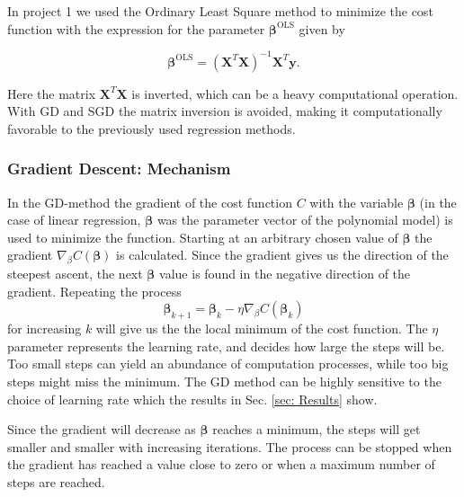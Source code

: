 \documentclass{emulateapj}
\begin{document}
In project 1 we used the Ordinary Least Square method to minimize the cost function with the expression for the parameter $\boldsymbol{\beta}^{\mathrm{OLS}}$ given by 

\begin{equation}
    \boldsymbol{\beta}^{\mathrm{OLS}} = (\mathbf{X}^T \mathbf{X})^{-1} \mathbf{X}^T \mathbf{y}.
    \label{eq:beta-ols}
\end{equation}

Here the matrix $\mathbf{X}^T\mathbf{X}$ is inverted, which can be a heavy computational operation. With GD and SGD the matrix inversion is avoided, making it computationally favorable to the previously used regression methods. 

\subsubsection{Gradient Descent: Mechanism}
\label{subsubsec: GD}
In the GD-method the gradient of the cost function $C$ with the variable $\mathbf{\beta}$ (in the case of linear regression, $\mathbf{\beta}$ was the parameter vector of the polynomial model) is used to minimize the function. Starting at an arbitrary chosen value of $\mathbf{\beta}$ the gradient $\nabla_\beta C(\mathbf{\beta})$ is calculated. Since the gradient gives us the direction of the steepest ascent, the next $\mathbf{\beta}$ value is found in the negative direction of the gradient. Repeating the process 
\begin{equation}
    \mathbf{\beta}_{k+1} = \mathbf{\beta}_k - \eta\nabla_\beta C(\mathbf{\beta}_k)
\end{equation}
for increasing $k$ will give us the the local minimum of the cost function. The $\eta$ parameter represents the learning rate, and decides how large the steps will be. Too small steps can yield an abundance of computation processes, while too big steps might miss the minimum. The GD method can be highly sensitive to the choice of learning rate which the results in Sec. \ref{sec: Results} show. 

Since the gradient will decrease as $\mathbf{\beta}$ reaches a minimum, the steps will get smaller and smaller with increasing iterations. The process can be stopped when the gradient has reached a value close to zero or when a maximum number of steps are reached.
\end{document}
